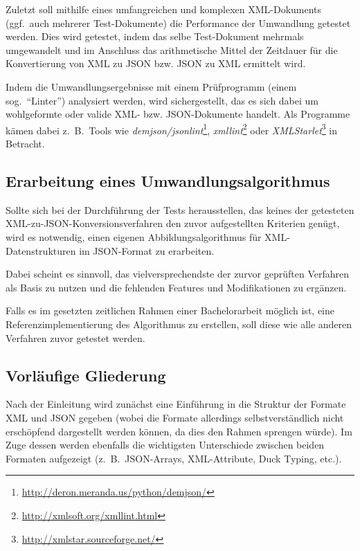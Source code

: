 \documentclass[conference]{template/IEEEtran}
\begin{document}
Zuletzt soll mithilfe eines umfangreichen und komplexen XML-Dokuments
(ggf.~auch mehrerer Test-Dokumente) die Performance der Umwandlung getestet
werden. Dies wird getestet, indem das selbe Test-Dokument mehrmals
umgewandelt und im Anschluss das arithmetische Mittel der Zeitdauer für die
Konvertierung von XML zu JSON bzw. JSON zu XML ermittelt wird.

Indem die Umwandlungsergebnisse mit einem Prüfprogramm
(einem sog.\ \enquote{Linter}) analysiert werden, wird sichergestellt, das es
sich dabei um wohlgeformte oder valide XML- bzw. JSON-Dokumente handelt. Als
Programme kämen dabei z.~B.\ Tools wie
\emph{demjson/jsonlint}\footnote{\url{http://deron.meranda.us/python/demjson/}},
\emph{xmllint}\footnote{\url{http://xmlsoft.org/xmllint.html}} oder
\emph{XMLStarlet}\footnote{\url{http://xmlstar.sourceforge.net/}} in Betracht.

\subsection{Erarbeitung eines Umwandlungsalgorithmus}
\label{subsec:development}

Sollte sich bei der Durchführung der Tests herausstellen, das keines der
getesteten XML-zu-JSON-Konversionsverfahren den zuvor aufgestellten Kriterien
genügt, wird es notwendig, einen eigenen Abbildungsalgorithmus für
XML-Datenstrukturen im JSON-Format zu erarbeiten.

Dabei scheint es sinnvoll, das vielversprechendste der zurvor geprüften
Verfahren als Basis zu nutzen und die fehlenden Features und Modifikationen
zu ergänzen.

Falls es im gesetzten zeitlichen Rahmen einer Bachelorarbeit möglich ist, eine
Referenzimplementierung des Algorithmus zu erstellen, soll diese wie alle
anderen Verfahren zuvor getestet werden.

\subsection{Vorläufige Gliederung}
\label{subsec:structure}

Nach der Einleitung wird zunächst eine Einführung in die Struktur der
Formate XML und JSON gegeben (wobei die Formate allerdings selbstverständlich
nicht erschöpfend dargestellt werden können, da dies den Rahmen sprengen
würde). Im Zuge dessen werden ebenfalls die wichtigsten Unterschiede zwischen
beiden Formaten aufgezeigt (z.~B.\ JSON-Arrays, XML-Attribute, Duck Typing,
etc.).
\end{document}
